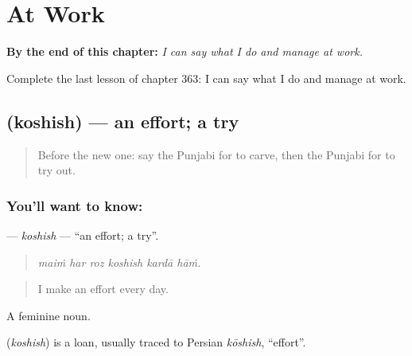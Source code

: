 
\chapter{At Work}
\label{ch:pa-a2-at-work}

\begin{chapteropening}
\textbf{By the end of this chapter:} \emph{I can say what I do and manage at work.}

Complete the last lesson of chapter 363: I can say what I do and manage at work.
\end{chapteropening}

\section[\texorpdfstring{\pa{ਕੋਸ਼ਿਸ਼} (koshish)}{ਕੋਸ਼ਿਸ਼ (koshish)}]{ (koshish) — an effort; a try}

\label{lesson:PA-C363-koshish}



\begin{quote}
Before the new one: say the Punjabi for to carve, then the Punjabi for to try out.
\end{quote}

\subsection*{You'll want to know: }
\textbf{} — \emph{koshish} — \textquotedblleft{}an effort; a try\textquotedblright{}.

\begin{quote}
     
\end{quote}

\begin{quote}
\emph{maiṁ har roz koshish kardā hāṁ.}
\end{quote}

\begin{quote}
I make an effort every day.
\end{quote}

A feminine noun.

\begin{cousinweb}
\textbf{} (\emph{koshish}) is a loan, usually traced to Persian \emph{kōshish}, \textquotedblleft{}effort\textquotedblright{}.
\end{cousinweb}

